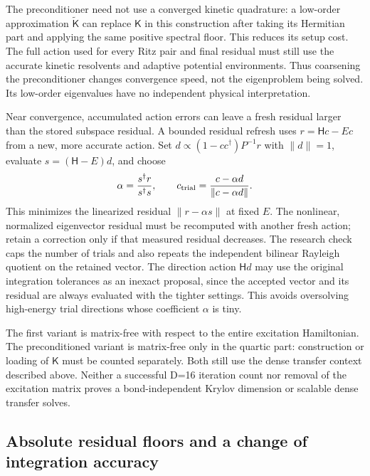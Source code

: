 \documentclass[11pt]{article}
\begin{document}
The preconditioner need not use a converged kinetic quadrature: a low-order
approximation $\widetilde{\mathsf K}$ can replace $\mathsf K$ in this
construction after taking its Hermitian part and applying the same positive
spectral floor. This reduces its setup cost. The full action used for every
Ritz pair and final residual must still use the accurate kinetic resolvents
and adaptive potential environments. Thus coarsening the preconditioner
changes convergence speed, not the eigenproblem being solved. Its low-order
eigenvalues have no independent physical interpretation.

Near convergence, accumulated action errors can leave a fresh residual
larger than the stored subspace residual. A bounded residual refresh uses
$r=\mathsf Hc-Ec$ from a new, more accurate action. Set
$d\propto(1-cc^\dagger)P^{-1}r$ with $\|d\|=1$, evaluate
$s=(\mathsf H-E)d$, and choose
\begin{equation}
 \alpha=\frac{s^\dagger r}{s^\dagger s},\qquad
 c_{\rm trial}=\frac{c-\alpha d}{\|c-\alpha d\|}.
\end{equation}
This minimizes the linearized residual $\|r-\alpha s\|$ at fixed $E$.
The nonlinear, normalized eigenvector residual must be recomputed with
another fresh action; retain a correction only if that measured residual
decreases. The research check caps the number of trials and also repeats
the independent bilinear Rayleigh quotient on the retained vector.
The direction action $\mathsf Hd$ may use the original integration
tolerances as an inexact proposal, since the accepted vector and its
residual are always evaluated with the tighter settings. This avoids
oversolving high-energy trial directions whose coefficient $\alpha$ is tiny.

The first variant is matrix-free with respect to the entire excitation
Hamiltonian. The preconditioned variant is matrix-free only in the quartic
part: construction or loading of $\mathsf K$ must be counted separately.
Both still use the dense transfer context described above. Neither a
successful D=16 iteration count nor removal of the excitation matrix proves
a bond-independent Krylov dimension or scalable dense transfer solves.

\subsection{Absolute residual floors and a change of integration accuracy}
\end{document}
